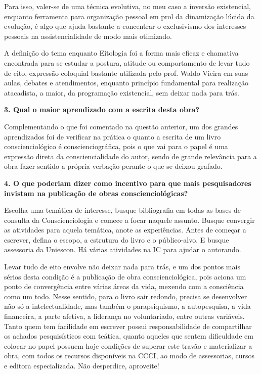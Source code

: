 \documentclass{gescons}
\begin{document}
\begin{multicols}{2}
Para isso, valer-se de uma técnica evolutiva, no meu caso a inversão existencial, enquanto ferramenta para organização pessoal em prol da dinamização lúcida da evolução, é algo que ajuda bastante a concentrar o exclusivismo dos interesses pessoais na assistencialidade de modo mais otimizado.

A definição do tema enquanto Eitologia foi a forma mais eficaz e chamativa encontrada para se estudar a postura, atitude ou comportamento de levar tudo de eito, expressão coloquial bastante utilizada pelo prof. Waldo Vieira em suas aulas, debates e atendimentos, enquanto princípio fundamental para realização atacadista, a maior, da programação existencial, sem deixar nada para trás.



\textbf{3.       Qual o maior aprendizado com a escrita desta obra?}

Complementando o que foi comentado na questão anterior, um dos grandes aprendizados foi de verificar na prática o quanto a escrita de um livro conscienciológico é conscienciográfica, pois o que vai para o papel é uma expressão direta da consciencialidade do autor, sendo de grande relevância para a obra fazer sentido a própria verbação perante o que se deixou grafado.


\textbf{4.       O que poderiam dizer como incentivo para que mais pesquisadores invistam na publicação de obras conscienciológicas?}

Escolha uma temática de interesse, busque bibliografia em todas as bases de consulta da Conscienciologia e comece a focar naquele assunto. Busque convergir as atividades para aquela temática, anote as experiências. Antes de começar a escrever, defina o escopo, a estrutura do livro e o público-alvo. E busque assessoria da Uniescon. Há várias atividades na IC para ajudar o autorando. 
    
Levar tudo de eito envolve não deixar nada para trás, e um dos pontos mais sérios desta condição é a publicação de obra conscienciológica, pois aciona um ponto de convergência entre várias áreas da vida, mexendo com a consciência como um todo. Nesse sentido, para o livro sair redondo, precisa se desenvolver não só a intelectualidade, mas também o parapsiquismo, a autopesquisa, a vida financeira, a parte afetiva, a liderança no voluntariado, entre outras variáveis. Tanto quem tem facilidade em escrever possui responsabilidade de compartilhar os achados pesquisísticos com teática, quanto aqueles que sentem dificuldade em colocar no papel possuem hoje condições de superar este travão e materializar a obra, com todos os recursos disponíveis na CCCI, ao modo de assessorias, cursos e editora especializada. Não desperdice, aproveite!



    \end{multicols}
\end{document}
